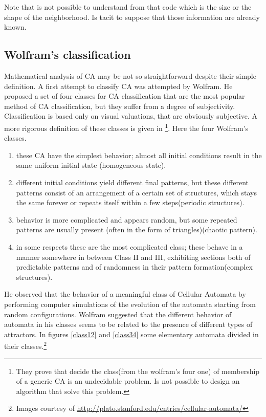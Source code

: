 Note that is not possible to understand from that code which is the size or the
shape of the neighborhood. Is tacit to suppose that those information are
already known.


\subsection{Wolfram's classification}
Mathematical analysis of CA may be not so straightforward despite their simple
definition. A first attempt to classify CA was attempted by
Wolfram\cite{wolfram2002}. He proposed a set of four classes for CA
classification that are the most popular method of CA classification, but they
suffer from a degree of subjectivity. Classification is based only on visual
valuations, that are obviously subjective. A more rigorous definition of these
classes is given in \footnote{They prove that decide the class(from the
wolfram's four one) of membership of a generic CA is an undecidable problem. Is
not possible to design an algorithm that solve this problem.}\cite{culik1998}.
Here the four Wolfram's classes.
\begin{enumerate}
  
  \item these CA have the simplest behavior; almost all initial conditions
  result in the same uniform initial state (homogeneous state).
  \item different initial conditions yield different final patterns, but
  these different patterns consist of an arrangement of a certain set of
  structures, which stays the same forever or repeats itself within a few
  steps(periodic structures).
  \item behavior is more complicated and appears random, but some repeated
  patterns are usually present (often in the form of triangles)(chaotic pattern).
  \item in some respects these are the most complicated class; these behave
  in a manner somewhere in between Class II and III, exhibiting sections
  both of predictable patterns and of randomness in their pattern
  formation(complex structures).
\end{enumerate}
He observed that the behavior of a meaningful class of Cellular Automata
by performing computer simulations of the evolution of the automata starting
from random configurations. Wolfram suggested that the different behavior of
automata in his classes seems to be related to the presence of different types
of attractors. In figures \ref{class12} and \ref{class34} some elementary automata divided in their classes.\footnote{Images courtesy of
\url{http://plato.stanford.edu/entries/cellular-automata/}}
